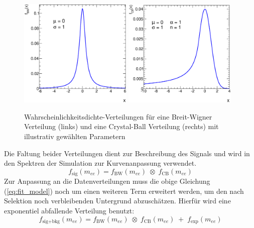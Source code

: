 \begin{figure}
    \centering
    \includegraphics[width=0.48\textwidth]{plots/breit_wigner}
    \hfill
    \includegraphics[width=0.48\textwidth]{plots/crystal_ball}
    \caption[Wahrscheinlichkeitsdichte-Verteilungen für eine Breit-Wigner
        Verteilung und eine Crystal-Ball Verteilung]
        {Wahrscheinlichkeitsdichte-Verteilungen für eine Breit-Wigner
        Verteilung (links) und eine Crystal-Ball Verteilung (rechts) mit
        illustrativ gewählten Parametern}
    \label{fig:crystal_ball}
\end{figure}

Die Faltung beider Verteilungen dient zur Beschreibung des Signals und wird in
den Spektren der Simulation zur Kurvenanpassung verwendet.
\begin{equation}
    f_\text{sig}(m_{ee}) = f_\text{BW}(m_{ee}) \;\otimes\; f_\text{CB}(m_{ee})
    \label{eq:fit_model}
\end{equation}
Zur Anpassung an die Datenverteilungen muss die obige Gleichung
(\ref{eq:fit_model}) noch um einen weiteren Term erweitert werden, um den nach
Selektion noch verbleibenden Untergrund abzuschätzen. Hierfür wird eine
exponentiel abfallende Verteilung benutzt:
\begin{equation}
    f_\text{sig+bkg}(m_{ee}) = f_\text{BW}(m_{ee})
        \;\otimes\; f_\text{CB}(m_{ee})
        \;+\; f_\text{exp}(m_{ee})
    \label{eq:fit_model_bkg}
\end{equation}

